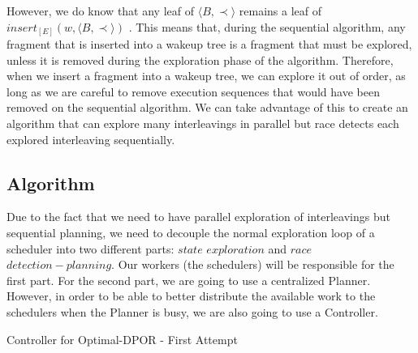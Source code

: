 However, we do know that any leaf of $\langle B , \prec \rangle$ remains a leaf of $insert_{[E]}(w,\langle B , \prec \rangle)$
\cite{AbdullaAronisJohnssonSagonasDPOR2014}. This means that, during the sequential algorithm, any fragment that
is inserted into a wakeup tree is a fragment that must be explored, unless it is removed during
the exploration phase of the algorithm. Therefore, when we insert a fragment into a wakeup tree,
we can explore it out of order, as long as we are careful to remove execution sequences that
would have been removed on the sequential algorithm. We can take advantage of this to create an algorithm that can explore 
many interleavings in parallel but race detects each explored interleaving sequentially.

\subsection{Algorithm}

Due to the fact that we need to have parallel exploration of interleavings but sequential planning, we need to decouple
the normal exploration loop of a scheduler into two different parts: $state$ $exploration$ and $race$ $detection-planning$.
Our workers (the schedulers) will be responsible for the first part. For the second part, we are going to use a centralized
Planner. However, in order to be able to better distribute the available work to the schedulers when the Planner is busy,
we are also going to use a Controller.

\begin{algorithm}
    \caption{Controller for Optimal-DPOR - First Attempt}
    \label{optcontrollerloop}

\end{algorithm}


